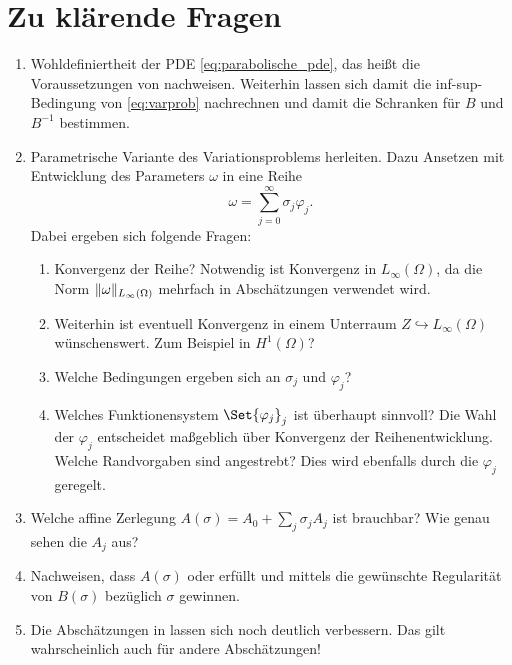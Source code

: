 

\clearpage
\section{Zu klärende Fragen} %
\label{sub:zu_kl_rende_fragen}

\begin{enumerate}
    \item Wohldefiniertheit der PDE \eqref{eq:parabolische_pde}, das heißt die Voraussetzungen von  nachweisen. Weiterhin lassen sich damit die inf-sup-Bedingung von \eqref{eq:varprob} nachrechnen und damit die Schranken für $B$ und $B^{-1}$ bestimmen.
    \item Parametrische Variante des Variationsproblems herleiten.
    Dazu Ansetzen mit Entwicklung des Parameters $\omega$ in eine Reihe
    \begin{equation}
        \omega = \sum_{j = 0}^{\infty} \sigma_{j} \varphi_{j}.
    \end{equation}
    Dabei ergeben sich folgende Fragen:
    \begin{enumerate}
        \item Konvergenz der Reihe? Notwendig ist Konvergenz in $L_{\infty}(\Omega)$, da die Norm $\lVert\omega\rVert_{L_{\infty}(\Omega)}$ mehrfach in Abschätzungen verwendet wird.
        \item Weiterhin ist eventuell Konvergenz in einem Unterraum $Z \hookrightarrow L_{\infty}(\Omega)$ wünschenswert.
        Zum Beispiel in $H^{1}(\Omega)$?
        \item Welche Bedingungen ergeben sich an $\sigma_{j}$ und $\varphi_{j}$?
        \item Welches Funktionensystem $\Set{ \varphi_{j} }_{j}$ ist überhaupt sinnvoll?
        Die Wahl der $\varphi_{j}$ entscheidet maßgeblich über Konvergenz der Reihenentwicklung.
        Welche Randvorgaben sind angestrebt?
        Dies wird ebenfalls durch die $\varphi_{j}$ geregelt.
    \end{enumerate}
    \item Welche affine Zerlegung $A(\sigma) = A_{0} + \sum_{j} \sigma_{j} A_{j}$ ist brauchbar?
    Wie genau sehen die $A_{j}$ aus?
    \item Nachweisen, dass $A(\sigma)$  oder  erfüllt und mittels  die gewünschte Regularität von $B(\sigma)$ bezüglich $\sigma$ gewinnen.
    \item Die Abschätzungen in  lassen sich noch deutlich verbessern.
    Das gilt wahrscheinlich auch für andere Abschätzungen!
\end{enumerate}

